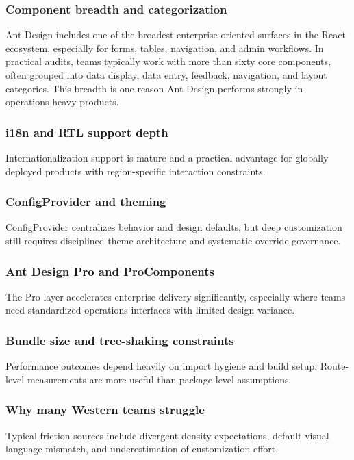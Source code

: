 \documentclass[11pt,twoside,a4paper]{article}
\begin{document}
\subsubsection{Component breadth and categorization}
Ant Design includes one of the broadest enterprise-oriented surfaces in the React ecosystem, especially for forms, tables, navigation, and admin workflows.
In practical audits, teams typically work with more than sixty core components, often grouped into data display, data entry, feedback, navigation, and layout categories. This breadth is one reason Ant Design performs strongly in operations-heavy products.

\subsubsection{i18n and RTL support depth}
Internationalization support is mature and a practical advantage for globally deployed products with region-specific interaction constraints.

\subsubsection{ConfigProvider and theming}
ConfigProvider centralizes behavior and design defaults, but deep customization still requires disciplined theme architecture and systematic override governance.

\subsubsection{Ant Design Pro and ProComponents}
The Pro layer accelerates enterprise delivery significantly, especially where teams need standardized operations interfaces with limited design variance.

\subsubsection{Bundle size and tree-shaking constraints}
Performance outcomes depend heavily on import hygiene and build setup. Route-level measurements are more useful than package-level assumptions.

\subsubsection{Why many Western teams struggle}
Typical friction sources include divergent density expectations, default visual language mismatch, and underestimation of customization effort.
\end{document}

